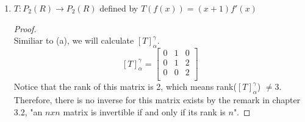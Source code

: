 \documentclass[11pt]{scrartcl}
\begin{document}
\begin{enumerate}[label=\alph*.]
{\begin{proof}
\begin{align*}
\begin{array}{ccc|ccc}
	0 & 1 & -4 & 0 & -1 & 0 \\ 
	0 & 0 & 1 & 0 & 0 & -1 \\ 
	\end{array}\right]\\
	r_1 \leftarrow 10r_3 + r_1, \quad r_2 \leftarrow 4r_3 + r_2\\
	(I_3|[T^-1]_{\alpha}^{\gamma})=
	\left[\begin{array}{ccc|ccc}
	1 & 0 & 0 & -1 & -2 & -10 \\ 
	0 & 1 & 0 & 0 & -1 & -4 \\ 
	0 & 0 & 1 & 0 & 0 & -1 \\ 
	\end{array}\right]\\
	\end{align*}	
	Therefore, the inverse of $T$ exists and is \\$T^{-1}(a_0 + a_1x + a_2x^2) 
	=-a_0 -2a_2 -10a_2 + (-a_1 - 4a_2)x -a_2x^2$
	\end{proof}
	}

	\item{
	$T : P_2(R) \rightarrow P_2(R)$ defined by $T(f(x)) = (x + 1)f'(x)$
	\begin{proof}
	\-\\
	Similiar to (a), we will calculate $[T]_{\alpha}^{\gamma}$.
	\[
	[T]_{\alpha}^{\gamma} = 
	\begin{bmatrix}
		0 & 1 & 0\\
		0 & 1 & 2\\ 
		0 & 0 & 2\\
	\end{bmatrix}
	\]
	Notice that the rank of this matrix is 2, which means rank($[T]_{\alpha}^{\gamma}$) $\neq 3$.
	Therefore, there is no inverse for this matrix exists by the remark in chapter 3.2,
	"an $nxn$ matrix is invertible if and only if its rank is $n$".
	\end{proof}
	}


\end{enumerate}
\end{document}
